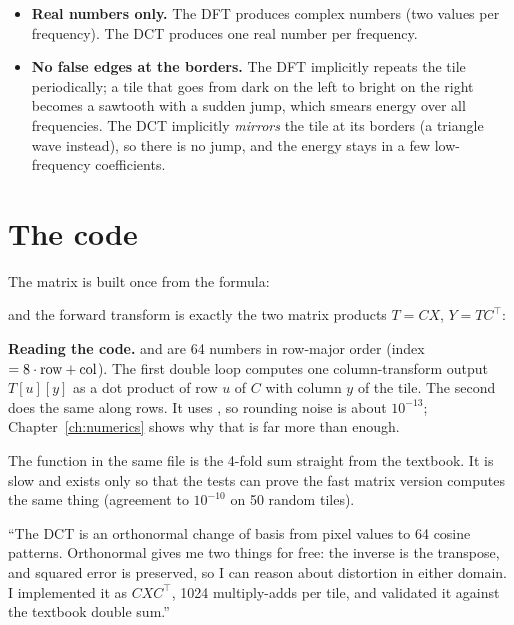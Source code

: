 \begin{itemize}
\item \textbf{Real numbers only.} The DFT produces complex numbers (two values per frequency). The DCT produces one real number per frequency.
\item \textbf{No false edges at the borders.} The DFT implicitly repeats the tile periodically; a tile that goes from dark on the left to bright on the right becomes a sawtooth with a sudden jump, which smears energy over all frequencies. The DCT implicitly \emph{mirrors} the tile at its borders (a triangle wave instead), so there is no jump, and the energy stays in a few low-frequency coefficients.
\end{itemize}

\section{The code}

The matrix is built once from the formula:

and the forward transform is exactly the two matrix products $T=CX$, $Y=TC^{\top}$:


\begin{plain}
\textbf{Reading the code.}  and  are 64 numbers in row-major order (index $=8\cdot{\rm row}+{\rm col}$). The first double loop computes one column-transform output $T[u][y]$ as a dot product of row $u$ of $C$ with column $y$ of the tile. The second does the same along rows. It uses , so rounding noise is about $10^{-13}$; Chapter~\ref{ch:numerics} shows why that is far more than enough.
\end{plain}

The function  in the same file is the 4-fold sum straight from the textbook. It is slow and exists only so that the tests can prove the fast matrix version computes the same thing (agreement to $10^{-10}$ on 50 random tiles).

\begin{sound}
``The DCT is an orthonormal change of basis from pixel values to 64 cosine patterns. Orthonormal gives me two things for free: the inverse is the transpose, and squared error is preserved, so I can reason about distortion in either domain. I implemented it as $CXC^{\top}$, 1024 multiply-adds per tile, and validated it against the textbook double sum.''
\end{sound}
